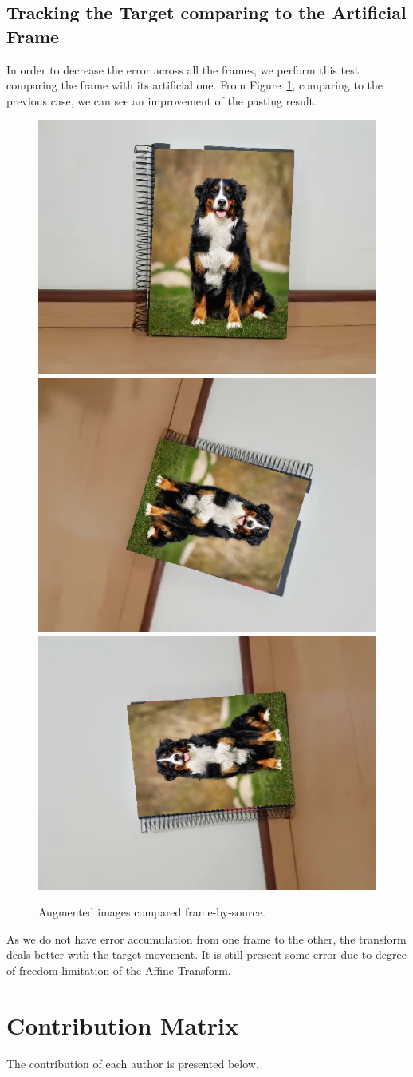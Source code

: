 \documentclass[]{IEEEtran}
\begin{document}
\subsection{Tracking the Target comparing to the Artificial Frame}

In order to decrease the error across all the frames, we perform this test comparing the frame with its artificial one. From Figure~\ref{fig:frame-by-source}, comparing to the previous case, we can see an improvement of the pasting result.

\begin{figure}[H]
  \centering
  \includegraphics[width=0.31\hsize]{img/frame-source_0.jpg}
  \includegraphics[width=0.31\hsize]{img/frame-source_1.jpg}
  \includegraphics[width=0.31\hsize]{img/frame-source_2.jpg}
  \caption{Augmented images compared frame-by-source.}
  \label{fig:frame-by-source}
\end{figure}

As we do not have error accumulation from one frame to the other, the transform deals better with the target movement. It is still present some error due to degree of freedom limitation of the Affine Transform. 

\section{Contribution Matrix}

The contribution of each author is presented below.
\end{document}
